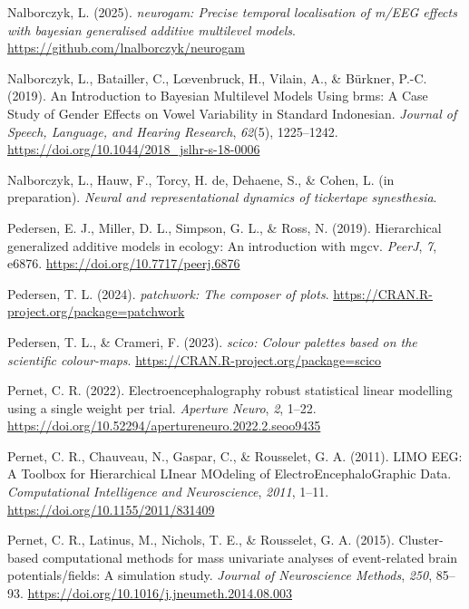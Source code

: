 \documentclass[
  man,
  floatsintext,
  longtable,
  a4paper,
  nolmodern,
  notxfonts,
  notimes,
  colorlinks=true,linkcolor=blue,citecolor=blue,urlcolor=blue]{apa7}
\newlength{\cslhangindent}
\newenvironment{CSLReferences}[2] %
 {\begin{list}{}{%
  \setlength{\itemindent}{0pt}
  \setlength{\leftmargin}{0pt}
  \setlength{\parsep}{0pt}
  \ifodd #1
   \setlength{\leftmargin}{\cslhangindent}
   \setlength{\itemindent}{-1\cslhangindent}
  \fi
  \setlength{\itemsep}{#2\baselineskip}}}
 {\end{list}}
\begin{document}
\begin{CSLReferences}{1}{0}
Nalborczyk, L. (2025). \emph{{neurogam}: Precise temporal localisation
of m/EEG effects with bayesian generalised additive multilevel models}.
\url{https://github.com/lnalborczyk/neurogam}

Nalborczyk, L., Batailler, C., Lœvenbruck, H., Vilain, A., \& Bürkner,
P.-C. (2019). An Introduction to Bayesian Multilevel Models Using brms:
A Case Study of Gender Effects on Vowel Variability in Standard
Indonesian. \emph{Journal of Speech, Language, and Hearing Research},
\emph{62}(5), 1225--1242.
\url{https://doi.org/10.1044/2018_jslhr-s-18-0006}

Nalborczyk, L., Hauw, F., Torcy, H. de, Dehaene, S., \& Cohen, L. (in
preparation). \emph{Neural and representational dynamics of tickertape
synesthesia}.

Pedersen, E. J., Miller, D. L., Simpson, G. L., \& Ross, N. (2019).
Hierarchical generalized additive models in ecology: An introduction
with mgcv. \emph{PeerJ}, \emph{7}, e6876.
\url{https://doi.org/10.7717/peerj.6876}

Pedersen, T. L. (2024). \emph{{patchwork}: The composer of plots}.
\url{https://CRAN.R-project.org/package=patchwork}

Pedersen, T. L., \& Crameri, F. (2023). \emph{{scico}: Colour palettes
based on the scientific colour-maps}.
\url{https://CRAN.R-project.org/package=scico}

Pernet, C. R. (2022). Electroencephalography robust statistical linear
modelling using a single weight per trial. \emph{Aperture Neuro},
\emph{2}, 1--22.
\url{https://doi.org/10.52294/apertureneuro.2022.2.seoo9435}

Pernet, C. R., Chauveau, N., Gaspar, C., \& Rousselet, G. A. (2011).
LIMO EEG: A Toolbox for Hierarchical LInear MOdeling of
ElectroEncephaloGraphic Data. \emph{Computational Intelligence and
Neuroscience}, \emph{2011}, 1--11.
\url{https://doi.org/10.1155/2011/831409}

Pernet, C. R., Latinus, M., Nichols, T. E., \& Rousselet, G. A. (2015).
Cluster-based computational methods for mass univariate analyses of
event-related brain potentials/fields: A simulation study. \emph{Journal
of Neuroscience Methods}, \emph{250}, 85--93.
\url{https://doi.org/10.1016/j.jneumeth.2014.08.003}


\end{CSLReferences}
\end{document}
